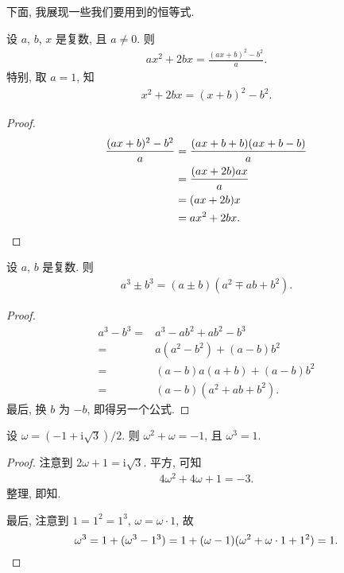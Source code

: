 \vspace{2ex}

下面, 我展现一些我们要用到的恒等式.

\begin{theorem}
    设 \(a\), \(b\), \(x\) 是复数,
    且 \(a \neq 0\).
    则
    \begin{align*}
        ax^2 + 2bx
        = \frac{(ax + b)^2 - b^2}{a}.
    \end{align*}
    特别, 取 \(a = 1\),
    知
    \begin{align*}
        x^2 + 2bx = (x + b)^2 - b^2.
    \end{align*}
\end{theorem}

\begin{proof}
    \begin{align*}
        \frac{(ax + b)^2 - b^2}{a}
        = {} & \frac{(ax + b + b)(ax + b - b)}{a} \\
        = {} & \frac{(ax + 2b)ax}{a}              \\
        = {} & (ax + 2b)x                         \\
        = {} & ax^2 + 2bx.
        \qedhere
    \end{align*}
\end{proof}

\begin{theorem}
    设 \(a\), \(b\) 是复数.
    则
    \begin{align*}
        a^3 \pm b^3 = (a \pm b)(a^2 \mp ab + b^2).
    \end{align*}
\end{theorem}

\begin{proof}
    \begin{align*}
        a^3 - b^3
        = {} & a^3 - ab^2 + ab^2 - b^3 \\
        = {} & a(a^2 - b^2) + (a-b)b^2 \\
        = {} & (a-b)a(a+b) + (a-b)b^2  \\
        = {} & (a-b)(a^2 + ab + b^2).
    \end{align*}
    最后, 换 \(b\) 为 \(-b\),
    即得另一个公式.
\end{proof}

\begin{theorem}
    设 \(\omega = (-1 + \mathrm{i} \sqrt{3})/2\).
    则 \(\omega^2 + \omega = -1\),
    且 \(\omega^3 = 1\).
\end{theorem}

\begin{proof}
    注意到 \(2\omega + 1 = \mathrm{i} \sqrt{3}\).
    平方, 可知
    \begin{align*}
        4\omega^2 + 4\omega + 1 = -3.
    \end{align*}
    整理, 即知.

    最后, 注意到 \(1 = 1^2 = 1^3\),
    \(\omega = \omega \cdot 1\),
    故
    \begin{equation*}
        \omega^3
        = 1 + (\omega^3 - 1^3)
        = 1 + (\omega - 1)(\omega^2 + \omega \cdot 1 + 1^2)
        = 1.
        \qedhere
    \end{equation*}
\end{proof}

